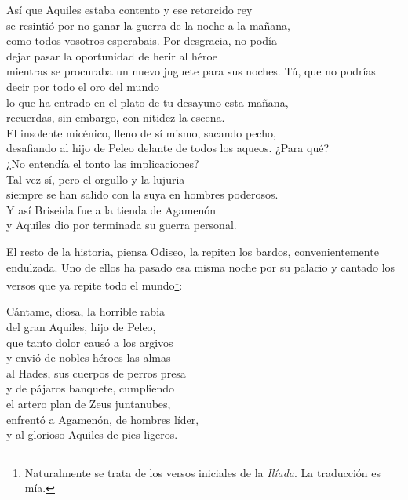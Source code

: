 \begin{versopropio}
Así que Aquiles estaba contento y ese retorcido rey\\
se resintió por no ganar la guerra de la noche a la mañana,\\
como todos vosotros esperabais. Por desgracia, no podía\\
dejar pasar la oportunidad de herir al héroe\\
mientras se procuraba un nuevo juguete para sus noches.
\stanzabreak
Tú, que no podrías decir por todo el oro del mundo\\
lo que ha entrado en el plato de tu desayuno esta mañana,\\
recuerdas, sin embargo, con nitidez la escena.\\
El insolente micénico, lleno de sí mismo, sacando pecho,\\
desafiando al hijo de Peleo delante de todos los aqueos. ¿Para qué?\\
¿No entendía el tonto las implicaciones?\\
Tal vez sí, pero el orgullo y la lujuria\\
siempre se han salido con la suya en hombres poderosos.\\
Y así Briseida fue a la tienda de Agamenón\\
y Aquiles dio por terminada su guerra personal.
\end{versopropio}

El resto de la historia, piensa Odiseo, la repiten los bardos, convenientemente endulzada. Uno de ellos ha pasado esa misma noche por su palacio y cantado los versos que ya repite todo el mundo\footnote{Naturalmente se trata de los versos iniciales de la \emph{Ilíada}. La traducción es mía.}:
\begin{versocita}
Cántame, diosa, la horrible rabia\\
del gran Aquiles, hijo de Peleo,\\
que tanto dolor causó a los argivos\\
y envió de nobles héroes las almas\\
al Hades, sus cuerpos de perros presa\\
y de pájaros banquete, cumpliendo\\
el artero plan de Zeus juntanubes,\\
enfrentó a Agamenón, de hombres líder,\\
y al glorioso Aquiles de pies ligeros.
\end{versocita}
